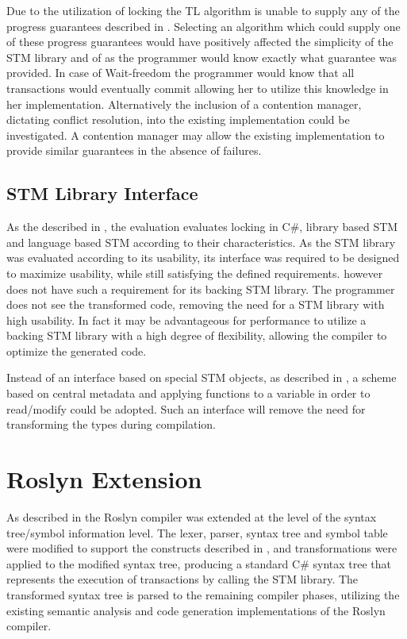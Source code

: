 Due to the utilization of locking the TL algorithm is unable to supply any of the progress guarantees described in . Selecting an algorithm which could supply one of these progress guarantees would have positively affected the simplicity of the \ac{STM} library and of \stmname as the programmer would know exactly what guarantee was provided. In case of Wait-freedom the programmer would know that all transactions would eventually commit allowing her to utilize this knowledge in her implementation. Alternatively the inclusion of a contention manager, dictating conflict resolution, into the existing implementation could be investigated. A contention manager may allow the existing implementation to provide similar guarantees in the absence of failures.

\subsection{STM Library Interface}
As the described in , the evaluation evaluates locking in C#, library based \ac{STM} and language based \ac{STM} according to their characteristics. As the \ac{STM} library was evaluated according to its usability, its interface was required to be designed to maximize usability, while still satisfying the defined requirements. \stmname however does not have such a requirement for its backing \ac{STM} library. The programmer does not see the transformed code, removing the need for a \ac{STM} library with high usability. In fact it may be advantageous for performance to utilize a backing \ac{STM} library with a high degree of flexibility, allowing the compiler to optimize the generated code. 

Instead of an interface based on special \ac{STM} objects, as described in , a scheme based on central metadata and applying functions to a variable in order to read/modify could be adopted. Such an interface will remove the need for transforming the types during compilation.

\section{Roslyn Extension}\label{sec:reflection_roslyn_extension}
As described in  the Roslyn compiler was extended at the level of the syntax tree/symbol information level. The lexer, parser, syntax tree and symbol table were modified to support the constructs described in , and transformations were applied to the modified syntax tree, producing a standard C\# syntax tree that represents the execution of transactions by calling the \ac{STM} library. The transformed syntax tree is parsed to the remaining compiler phases, utilizing the existing semantic analysis and code generation implementations of the Roslyn compiler. 

